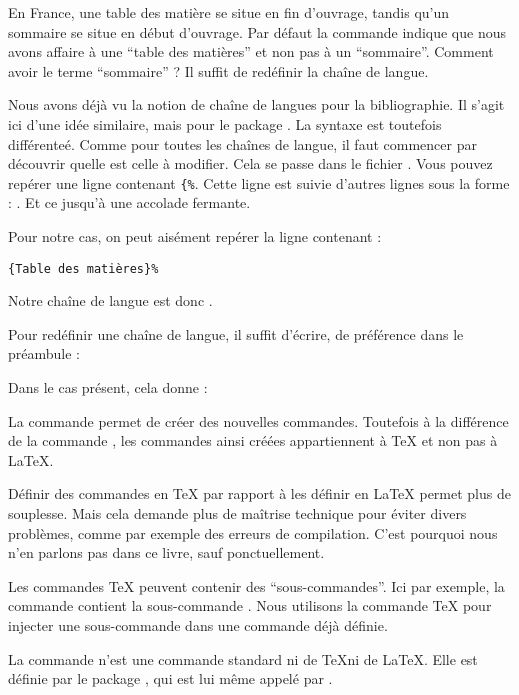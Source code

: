 En France, une table des matière se situe en fin d'ouvrage, tandis qu'un sommaire se situe en début d'ouvrage. Par défaut la commande  indique que nous avons affaire à une  \enquote{table des matières} et non pas à un \enquote{sommaire}. Comment avoir le terme  \enquote{sommaire} ? Il suffit de redéfinir la chaîne de langue. 

Nous avons déjà vu la notion de chaîne de langues pour la bibliographie. Il s'agit ici  d'une idée similaire, mais pour le package . La syntaxe est toutefois différenteé. Comme pour  toutes les chaînes de langue, il faut commencer par découvrir quelle est celle à modifier. Cela se passe dans le fichier . Vous pouvez repérer une ligne contenant \verb|{%|. 
Cette ligne est suivie d'autres lignes sous la forme : . Et ce jusqu'à une accolade fermante.

Pour notre cas, on peut aisément repérer la ligne contenant :

 \verb|{Table des matières}%|

Notre chaîne de langue est donc .

Pour  redéfinir une chaîne de langue, il suffit d'écrire, de préférence dans le préambule :

\begin{latexcode}
\gappto\captionsfrench{\renewcommand{<\chaine>}{Valeur}}
\end{latexcode}

Dans le cas présent, cela donne :

\begin{latexcode}
\gappto\captionsfrench{\renewcommand{\contentsname}{Sommaire}}
\end{latexcode}



\begin{plusloins}
La commande  permet de créer des nouvelles commandes. Toutefois à la différence de la commande , les commandes ainsi créées appartiennent à \TeX{} et non pas à \LaTeX{}.

Définir des commandes en \TeX{} par rapport à les définir en \LaTeX{} permet plus de souplesse. Mais cela demande plus de maîtrise technique pour éviter divers problèmes, comme par exemple des erreurs de compilation. C'est pourquoi nous n'en parlons pas dans ce livre, sauf ponctuellement.

Les commandes \TeX{} peuvent contenir des \enquote{sous-commandes}. Ici par exemple, la commande  contient la sous-commande . Nous utilisons la commande \TeX{}  pour injecter une sous-commande dans une commande déjà définie.

La commande  n'est une commande standard ni de \TeX ni de \LaTeX. Elle est définie par le package , qui est lui même appelé par .
\end{plusloins}

